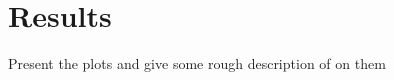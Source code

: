 
\section{Results}
\label{sec:results}

Present the plots and give some rough description of on them